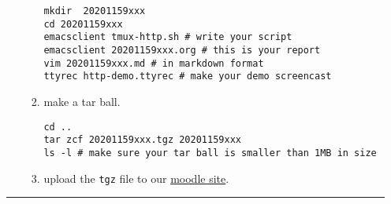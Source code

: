 \documentclass{article} [NO-DEFAULT-PACKAGES] \usepackage{wx672hyperref}
\begin{document}
\begin{itemize}
\begin{enumerate}
\begin{enumerate}
\begin{verbatim}
mkdir  20201159xxx
cd 20201159xxx
emacsclient tmux-http.sh # write your script
emacsclient 20201159xxx.org # this is your report
vim 20201159xxx.md # in markdown format
ttyrec http-demo.ttyrec # make your demo screencast
\end{verbatim}

\item make a tar ball.
\begin{verbatim}
cd ..
tar zcf 20201159xxx.tgz 20201159xxx
ls -l # make sure your tar ball is smaller than 1MB in size         
\end{verbatim}

\item upload the \texttt{tgz} file to our \href{https://cs6.swfu.edu.cn/moodle/mod/assign/view.php?id=536}{moodle site}.
\end{enumerate}
\end{enumerate}

\noindent\rule{\textwidth}{0.5pt}
\end{itemize}
\end{document}
